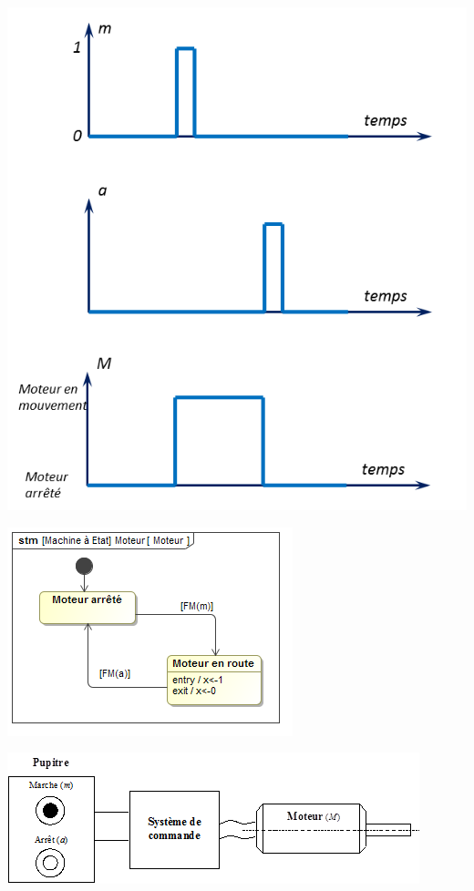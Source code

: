 \documentclass[10pt]{article}
\begin{document}
\begin{minipage}[c]{.47\linewidth}
\begin{center}
\includegraphics[width=.9\textwidth]{images/Chrono2}
\end{center}
\end{minipage} \hfill
\begin{minipage}[c]{.47\linewidth}
\begin{center}
\includegraphics[width=.95\textwidth]{images/Moteur}

\includegraphics[width=.95\textwidth]{images/Moteur_im}
\end{center}
\end{minipage}
\end{document}
